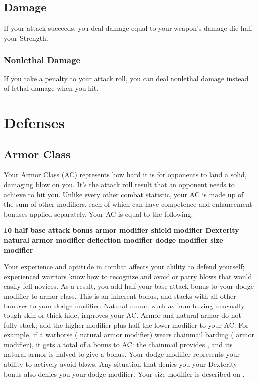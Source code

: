 \subsection{Damage}
If your attack succeeds, you deal damage equal to your weapon's damage die \add half your Strength.

\subsubsection{Nonlethal Damage}
If you take a  penalty to your attack roll, you can deal nonlethal damage instead of lethal damage when you hit.

\section{Defenses}

\subsection{Armor Class}
Your Armor Class (AC) represents how hard it is for opponents to land a solid, damaging blow on you. It's the attack roll result that an opponent needs to achieve to hit you. Unlike every other combat statistic, your AC is made up of the sum of other modifiers, each of which can have competence and enhancement bonuses applied separately. Your AC is equal to the following:

{\centering \textbf{10 \add half base attack bonus \add armor modifier \add shield modifier \add Dexterity \add natural armor modifier \add deflection modifier \add dodge modifier \add size modifier}}

 Your experience and aptitude in combat affects your ability to defend yourself; experienced warriors know how to recognize and avoid or parry blows that would easily fell novices. As a result, you add half your base attack bonus to your dodge modifier to armor class. This is an inherent bonus, and stacks with all other bonuses to your dodge modifier.
 Natural armor, such as from having unusually tough skin or thick hide, improves your AC. Armor and natural armor do not fully stack; add the higher modifier plus half the lower modifier to your AC. For example, if a warhorse ( natural armor modifier) wears chainmail barding ( armor modifier), it gets a total of a  bonus to AC: the chainmail provides , and its natural armor is halved to give a  bonus.
 Your dodge modifier represents your ability to actively avoid blows. Any situation that denies you your Dexterity bonus also denies you your dodge modifier.
 Your size modifier is described on .

